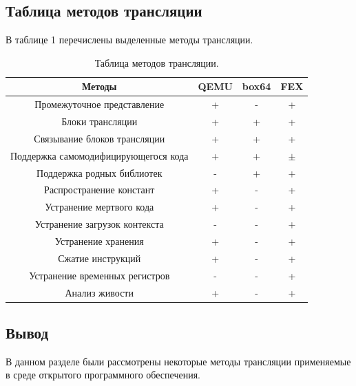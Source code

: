 \subsection{Таблица методов трансляции}

В таблице 1 %
перечислены выделенные методы трансляции. 

\begin{table}[!htb]
	\label{table:methods}
	\begin{center}
		\caption{Таблица методов трансляции.}
			\begin{tabular}{|c|c|c|c|}
				\hline
				\bfseries Методы & \bfseries QEMU & \bfseries box64 & \bfseries FEX  \\
				\hline
				Промежуточное представление & + & - & + \\ \hline
				Блоки трансляции & + & + & + \\ \hline
				Связывание блоков трансляции & + & + & + \\ \hline
				Поддержка самомодифицирующегося кода & + & + & $\pm$ \\ \hline
				Поддержка родных библиотек & - & + & + \\ \hline
				Распространение констант & + & - & + \\ \hline
				Устранение мертвого кода & + & - & + \\ \hline
				Устранение загрузок контекста & - & - & + \\ \hline
				Устранение хранения & + & - & + \\ \hline
				Сжатие инструкций & + & - & + \\ \hline
				Устранение временных регистров & - & - & + \\ \hline
				Анализ живости & + & - & + \\ \hline
		\end{tabular}
	\end{center}
\end{table}

\clearpage

\subsection{Вывод}

В данном разделе были рассмотрены некоторые методы трансляции применяемые в среде открытого программного обеспечения.

